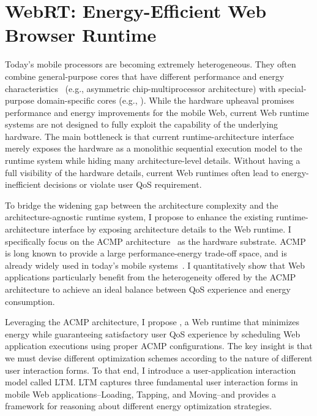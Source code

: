 
\chapter{WebRT: Energy-Efficient Web Browser Runtime}
\label{sec:runtime}

Today's mobile processors are becoming extremely heterogeneous. They often combine general-purpose cores that have different performance and energy characteristics~\cite{single-ISA} (e.g., asymmetric chip-multiprocessor architecture) with special-purpose domain-specific cores (e.g., \webcore). While the hardware upheaval promises performance and energy improvements for the mobile Web, current Web runtime systems are not designed to fully exploit the capability of the underlying hardware. The main bottleneck is that current runtime-architecture interface merely exposes the hardware as a monolithic sequential execution model to the runtime system while hiding many architecture-level details. Without having a full visibility of the hardware details, current Web runtimes often lead to energy-inefficient decisions or violate user QoS requirement.

To bridge the widening gap between the architecture complexity and the architecture-agnostic runtime system, I propose to enhance the existing runtime-architecture interface by exposing architecture details to the Web runtime. I specifically focus on the ACMP architecture~\cite{acmp,single-ISA} as the hardware substrate. ACMP is long known to provide a large performance-energy trade-off space, and is already widely used in today's mobile systems~\cite{big-little-future,exynos5biglittle}. I  quantitatively show that Web applications particularly benefit from the heterogeneity offered by the ACMP architecture to achieve an ideal balance between QoS experience and energy consumption.

Leveraging the ACMP architecture, I propose \webrt, a Web runtime that minimizes energy while guaranteeing satisfactory user QoS experience by scheduling Web application executions using proper ACMP configurations. The key insight is that we must devise different optimization schemes according to the nature of different user interaction forms. To that end, I introduce a user-application interaction model called LTM. LTM captures three fundamental user interaction forms in mobile Web applications--Loading, Tapping, and Moving--and provides a framework for reasoning about different energy optimization strategies.

